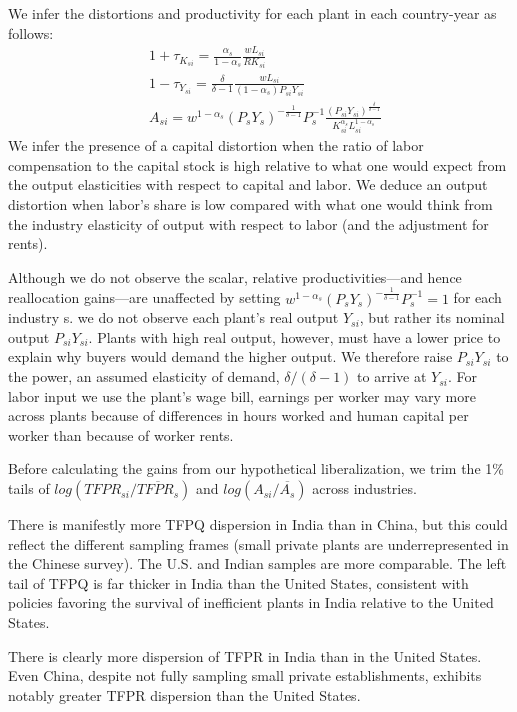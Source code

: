 \documentclass{article}
\begin{document}
We infer the distortions and productivity for each plant in each  country-year as follows:
\begin{align*}
    &1+\tau_{K_{si}}=\frac{\alpha_s}{1-\alpha_s} \frac{wL_{si}}{RK_{si}}\\
    &1-\tau_{Y_{si}}=\frac{\delta}{\delta-1} \frac{wL_{si}}{(1-\alpha_s)P_{si}Y_{si}}\\
    &A_{si}=w^{1-\alpha_s} (P_sY_s)^{-\frac{1}{\delta-1}} P_s^{-1} \frac{(P_{si}Y_{si})^{\frac{\delta}{\delta-1}}}{K_{si}^{\alpha_s}L_{si}^{1-\alpha_s}}
\end{align*}
We infer the presence of a capital distortion when the ratio of labor compensation to the capital stock is high relative to what one would expect from the output elasticities with respect to capital and labor. We deduce an output distortion when labor’s share is low compared with what one would think from the industry elasticity of output with respect to labor (and the adjustment for rents).

Although we do not observe the scalar, relative productivities—and hence reallocation gains—are unaffected by setting $w^{1-\alpha_s} (P_sY_s)^{-\frac{1}{\delta-1}} P_s^{-1} = 1$ for each industry s. we do not observe each plant’s real output $Y_{si}$, but rather its nominal output $P_{si}Y_{si}$. Plants with high real output, however, must have a lower price to explain why buyers would demand the higher output. We therefore raise $P_{si}Y_{si}$ to the power, an assumed elasticity of demand, $\delta/(\delta − 1)$ to arrive at $Y_{si}$. For labor input we use the plant’s wage bill, earnings per worker may vary more across plants because of differences in hours worked and human capital per worker than because of worker rents. 

Before calculating the gains from our hypothetical liberalization, we trim the 1\% tails of $log(TFPR_{si}/\overline{TFPR_s})$ and $log(A_{si}/\overline{A_s})$ across industries. 

There is manifestly more TFPQ dispersion in India than in China, but this could reflect the different sampling frames (small private plants are underrepresented
in the Chinese survey). The U.S. and Indian samples are more comparable. The left tail of TFPQ is far thicker in India than the United States, consistent with policies favoring the survival of inefficient plants in India relative to the United States.

There is clearly more dispersion of TFPR in India than in the United States. Even China, despite not fully sampling small private establishments, exhibits notably greater TFPR dispersion than the United States. 
\end{document}
